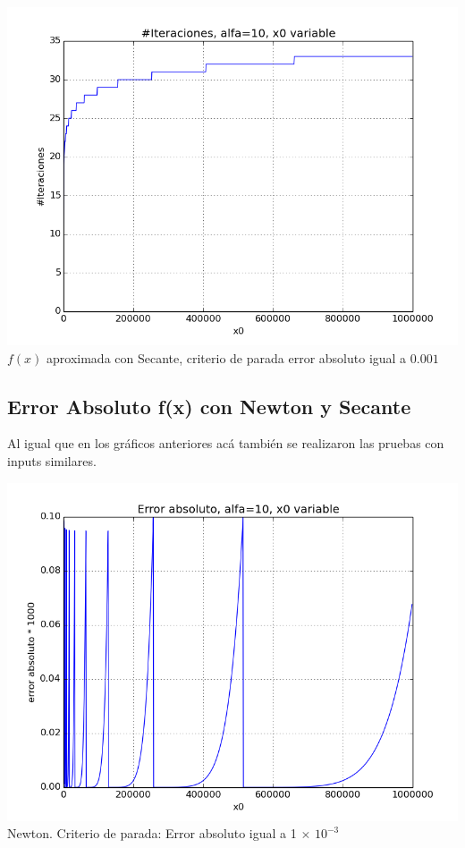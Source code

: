 \begin{center}
\includegraphics[scale=0.5]{graficos/iteraciones-f-secante-alfa_fijo-absoluto-0.001-alejando.png}\\
$f(x)$ aproximada con Secante, criterio de parada error absoluto igual a $0.001$
\end{center}

\subsection{Error Absoluto f(x) con Newton y Secante}
Al igual que en los gráficos anteriores acá también se realizaron las pruebas con inputs similares.\\

\begin{center}
\includegraphics[scale=0.5]{graficos/x0s-f-newton-alfa_fijo-absoluto-0.001-alejando.png}\\
Newton. Criterio de parada: Error absoluto igual a 1 $\times$ $10^{-3}$
\end{center}

